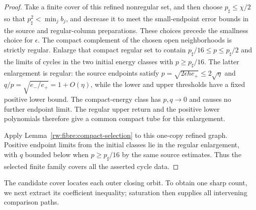 \begin{proof}
Take a finite cover of this refined nonregular set, and then choose
$p_\sharp\le\chi/2$ so that $p_\sharp^2<\min_j b_j$,
and decrease it to meet the small-endpoint error bounds in the
source and regular-column preparations. These choices precede
the smallness choice for $\epsilon$.
The compact complement of the chosen open neighborhoods is
strictly regular. Enlarge that compact regular set to contain
$p_\sharp/16\le p\le p_\sharp/2$ and the limits of cycles
in the two initial energy classes with $p\ge p_\sharp/16$.
The latter enlargement is regular: the source endpoints satisfy
$p=\sqrt{2\epsilon h e_+}\le2\sqrt\eta$ and
$q/p=\sqrt{e_-/e_+}=1+O(\eta)$, while the lower and upper
thresholds have a fixed positive lower bound. The compact-energy
class has $p,q\to0$ and causes no further endpoint limit.
The regular upper return and the positive lower polynomials
therefore give a common compact tube for this enlargement.

Apply Lemma~\ref{rw:fibre:compact-selection} to this one-copy
refined graph. Positive endpoint limits from the initial classes lie
in the regular enlargement, with $q$ bounded below when
$p\ge p_\sharp/16$ by the same source estimates. Thus the selected
finite family covers all the asserted cycle data.
\end{proof}

The candidate cover locates each outer closing orbit. To obtain one
sharp count, we next extract its coefficient inequality; saturation
then supplies all intervening comparison paths.

